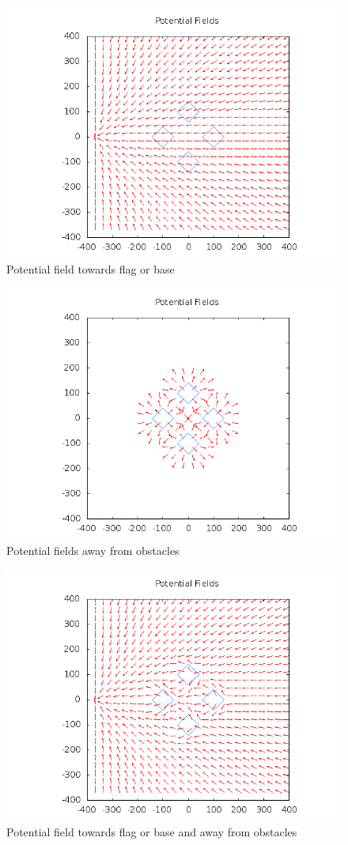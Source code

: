 \documentclass[11pt]{article}
\begin{document}
\begin{figure}[h!]
	\caption{Potential field towards flag or base}
	\includegraphics[scale=.4]{plots/rotated_box_world/pfFlag.png}
\end{figure}
\begin{figure}[h!]
	\caption{Potential fields away from obstacles}
	\includegraphics[scale=.4]{plots/rotated_box_world/pfObstacles.png}
\end{figure}
\begin{figure}[h!]
	\caption{Potential field towards flag or base and away from obstacles}
	\includegraphics[scale=.4]{plots/rotated_box_world/pfFlagsAndObstacles.png}
\end{figure}
\end{document}
